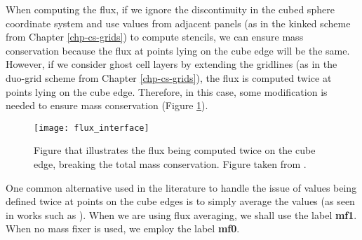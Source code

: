 When computing the flux, if we ignore the discontinuity in the cubed sphere coordinate system and use values from adjacent panels
(as in the kinked scheme from Chapter \ref{chp-cs-grids}) to compute stencils, we can ensure mass conservation because the
flux at points lying on the cube edge will be the same.
However, if we consider ghost cell layers by extending the gridlines (as in the duo-grid scheme from Chapter \ref{chp-cs-grids}),
the flux is computed twice at points lying on the cube edge.
Therefore, in this case, some modification is needed to ensure mass conservation (Figure \ref{chp5-fluxcube}).
\begin{figure}[!htb]
	\centering
	\texttt{[image: flux\_interface]}
	\caption{Figure that illustrates the flux being computed twice on
		the cube edge, breaking the total mass conservation.
		Figure taken from \citet{ross:2006}.\label{chp5-fluxcube}}
\end{figure}
One common alternative used in the literature to handle the issue of values being defined twice at points on the
cube edges is to simply average the values (as seen in works such as \citet{ross:2006, chen:2008, chen:2021, mouallem:2023}).
When we are using flux averaging, we shall use the label \textbf{mf1}. When no mass fixer is used, we employ the label \textbf{mf0}.
 
